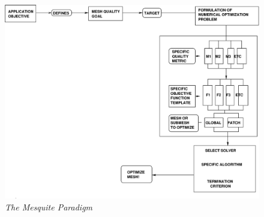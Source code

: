 
\begin{figure}[htb]
\begin{center}
\includegraphics[width=4.7in]{msq-paradigm}
\caption{\em The Mesquite Paradigm \label{Paradigm} }
\end{center}
\end{figure}

